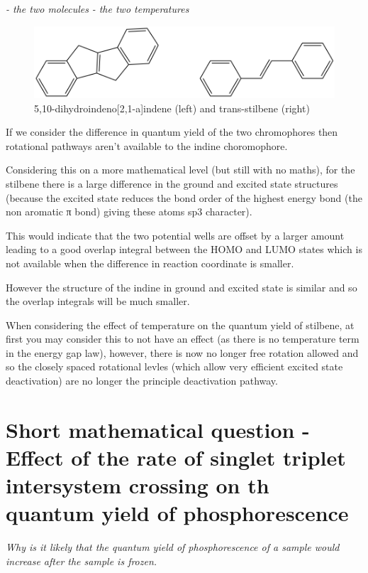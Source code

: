 \documentclass[
]{book}
\begin{document}
\emph{- the two molecules}
\emph{- the two temperatures}

\begin{figure}

{\centering \includegraphics[width=0.6\linewidth]{Images/stilbeneindene} 

}

\caption{5,10-dihydroindeno[2,1-a]indene (left) and trans-stilbene (right)}\label{fig:stilbeneindene}
\end{figure}

If we consider the difference in quantum yield of the two chromophores then rotational pathways aren't available to the indine choromophore.

Considering this on a more mathematical level (but still with no maths), for the stilbene there is a large difference in the ground and excited state structures (because the excited state reduces the bond order of the highest energy bond (the non aromatic π bond) giving these atoms sp3 character).

This would indicate that the two potential wells are offset by a larger amount leading to a good overlap integral between the HOMO and LUMO states which is not available when the difference in reaction coordinate is smaller.

However the structure of the indine in ground and excited state is similar and so the overlap integrals will be much smaller.

When considering the effect of temperature on the quantum yield of stilbene, at first you may consider this to not have an effect (as there is no temperature term in the energy gap law), however, there is now no longer free rotation allowed and so the closely spaced rotational levles (which allow very efficient excited state deactivation) are no longer the principle deactivation pathway.

\hypertarget{sec:ratephos}{%
\section{Short mathematical question - Effect of the rate of singlet triplet intersystem crossing on th quantum yield of phosphorescence}\label{sec:ratephos}}

\emph{Why is it likely that the quantum yield of phosphorescence of a sample would increase after the sample is frozen.}
\end{document}
